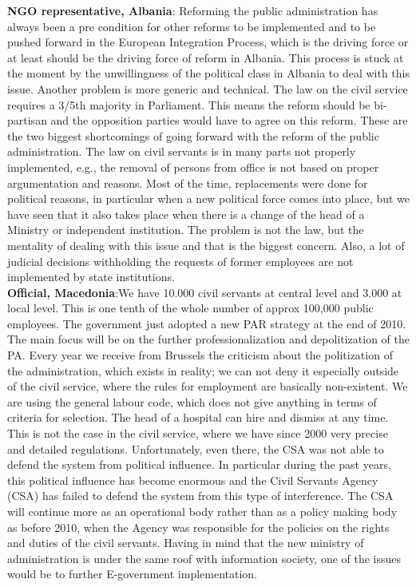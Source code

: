 \textbf{NGO representative, Albania}: Reforming the public administration has always been a pre condition for other reforms to be implemented and to be pushed forward in the European Integration Process, which is the driving force or at least should be the driving force of reform in Albania. This process is stuck at the moment by the unwillingness of the political class in Albania to deal with this issue. Another problem is more generic and technical. The law on the civil service requires a 3/5th majority in Parliament. This means the reform should be bi-partisan and the opposition parties would have to agree on this reform. These are the two biggest shortcomings of going forward with the reform of the public administration. The law on civil servants is in many parts not properly implemented, e.g., the removal of persons from office is not based on proper argumentation and reasons. Most of the time, replacements were done for political reasons, in particular when a new political force comes into place, but we have seen that it also takes place when there is a change of the head of a Ministry or independent institution. The problem is not the law, but the mentality of dealing with this issue and that is the biggest concern. Also, a lot of judicial decisions withholding the requests of former employees are not implemented by state institutions.\\
\textbf{Official, Macedonia}:We have 10.000 civil servants at central level and 3.000 at local level. This is one tenth of the whole number of approx 100,000 public employees. The government just adopted a new PAR strategy at the end of 2010. The main focus will be on the further professionalization and depolitization of the PA. Every year we receive from Brussels the criticism about the politization of the administration, which exists in reality; we can not deny it especially outside of the civil service, where the rules for employment are basically non-existent. We are using the general labour code, which does not give anything in terms of criteria for selection. The head of a hospital can hire and dismiss at any time. This is not the case in the civil service, where we have since 2000 very precise and detailed regulations. Unfortunately, even there, the CSA was not able to defend the system from political influence. In particular during the past years, this political influence has become enormous and the Civil Servants Agency (CSA) has failed to defend the system from this type of interference. The CSA will continue more as an operational body rather than as a policy making body as before 2010, when the Agency was responsible for the policies on the rights and duties of the civil servants. Having in mind that the new ministry of administration is under the same roof with information society, one of the issues would be to further E-government implementation.\\
